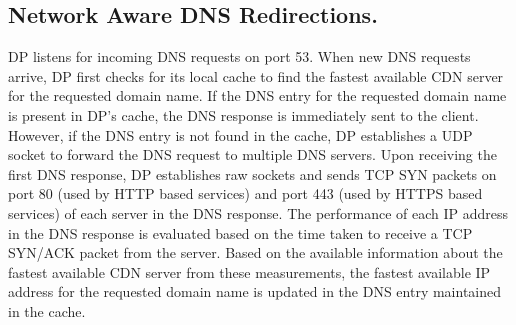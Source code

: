 \documentclass{llncs}
\begin{document}
\subsection{Network Aware DNS Redirections.}

DP listens for incoming DNS requests on port 53.
When new DNS requests arrive, DP first checks for its local cache to find the fastest available CDN server for the requested domain name.
If the DNS entry for the requested domain name is present in DP's cache, the DNS response is immediately sent to the client.
However, if the DNS entry is not found in the cache, DP establishes a UDP socket to forward the DNS request to multiple DNS servers.
Upon receiving the first DNS response, DP establishes raw sockets and sends TCP SYN packets on port 80 (used by HTTP based services) and port 443 (used by HTTPS based services) of each server in the DNS response.
The performance of each IP address in the DNS response is evaluated based on the time taken to receive a TCP SYN/ACK packet from the server.
Based on the available information about the fastest available CDN server from these measurements, the fastest available IP address for the requested domain name is updated in the DNS entry maintained in the cache.
\end{document}
